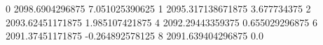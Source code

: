 0 2098.6904296875 7.051025390625
1 2095.317138671875 3.677734375
2 2093.62451171875 1.985107421875
4 2092.29443359375 0.655029296875
6 2091.37451171875 -0.264892578125
8 2091.639404296875 0.0
